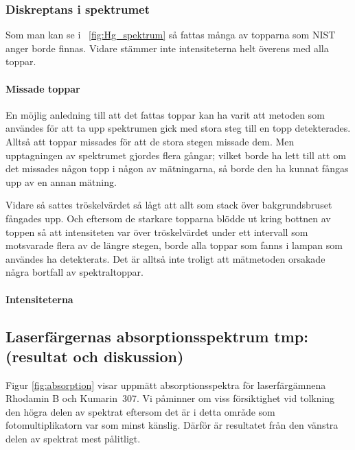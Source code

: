 \documentclass[11pt,a4paper]{article}
\newcommand{\figref}{\figurename~\ref}
\begin{document}
\subsubsection{Diskreptans i spektrumet}
Som man kan se i \figref{fig:Hg_spektrum} så fattas många av topparna
som NIST \cite{NIST_spectrum} anger borde finnas. Vidare stämmer inte
intensiteterna helt överens med alla toppar. 

\paragraph{Missade toppar}
En möjlig anledning till att det fattas toppar kan ha varit att
metoden som användes för att ta upp spektrumen gick med stora steg
till en topp detekterades. Alltså att toppar missades för att de stora
stegen missade dem. Men upptagningen av spektrumet gjordes flera
gångar; vilket borde ha lett till att om det missades någon topp i
någon av mätningarna, så borde den ha kunnat fångas upp av en annan
mätning. 

Vidare så sattes tröskelvärdet så lågt att allt som stack över
bakgrundsbruset fångades upp. Och eftersom de starkare topparna blödde
ut kring bottnen av toppen så att intensiteten var över tröskelvärdet
under ett intervall som motsvarade flera av de längre stegen, borde
alla toppar som fanns i lampan som användes ha detekterats. Det är
alltså inte troligt att mätmetoden orsakade några bortfall av
spektraltoppar. 


\paragraph{Intensiteterna}

\subsection{Laserfärgernas absorptionsspektrum tmp:(resultat och diskussion)}

Figur \ref{fig:absorption} visar uppmätt absorptionsspektra för
laserfärgämnena Rhodamin B och Kumarin~307. Vi påminner om viss
försiktighet vid tolkning den högra delen av spektrat eftersom det är
i detta område som fotomultiplikatorn var som minst känslig. Därför är
resultatet från den vänstra delen av spektrat mest pålitligt. 
\end{document}
